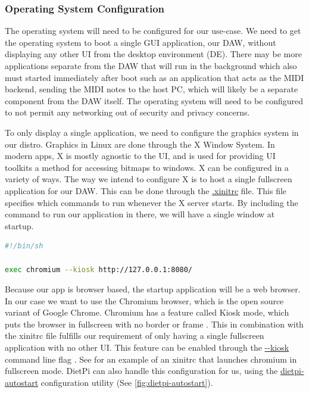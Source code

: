 \subsubsection{Operating System Configuration}
\label{sec:research:subsec:os_config}

The operating system will need to be configured for our use-case. We need to get the
operating system to boot a single GUI application, our DAW, without displaying any other
UI from the desktop environment (DE). There may be more applications separate from the DAW
that will run in the background which also must started immediately after boot such as an
application that acts as the MIDI backend, sending the MIDI notes to the host PC, which
will likely be a separate component from the DAW itself. The operating system will need to
be configured to not permit any networking out of security and privacy concerns.

To only display a single application, we need to configure the graphics system in our
distro. Graphics in Linux are done through the X Window System. In modern apps, X is
mostly agnostic to the UI, and is used for providing UI toolkits a method for accessing
bitmaps to windows. X can be configured in a variety of ways. The way we intend to
configure X is to host a single fullscreen application for our DAW. This can be done
through the \url{.xinitrc} file. This file specifies which commands to run whenever the X
server starts. By including the command to run our application in there, we will have a
single window at startup.

\begin{lstlisting}[language=bash, label={lst:xinitrc}, caption=Example .xinitrc]
#!/bin/sh

exec chromium --kiosk http://127.0.0.1:8080/
\end{lstlisting}

Because our app is browser based, the startup application will be a web browser. In our
case we want to use the Chromium browser, which is the open source variant of Google
Chrome. Chromium has a feature called Kiosk mode, which puts the browser in fullscreen
with no border or frame \autocite{chromiumKioskMode}. This in combination with the xinitrc
file fulfills our requirement of only having a single fullscreen application with no other
UI. This feature can be enabled through the \url{--kiosk} command line flag
\autocite{chromiumKioskMode}. See  for an example of an xinitrc that
launches chromium in fullscreen mode. DietPi can also handle this configuration for us,
using the \url{dietpi-autostart} configuration utility (See
\autoref{fig:dietpi-autostart}).

